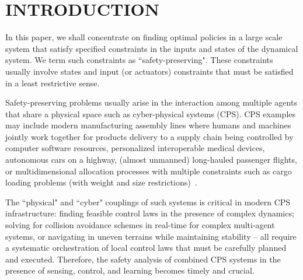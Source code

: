 
\section{INTRODUCTION}

In this paper, we shall concentrate on finding optimal policies in a large scale system that satisfy specified constraints in the inputs and states of the dynamical system. We term such constraints as ``safety-preserving". These constraints usually involve states and input (or actuators) constraints that must be satisfied in a least restrictive sense.  

Safety-preserving problems usually arise in the interaction among multiple agents that share a physical  space such as cyber-physical systems (CPS). CPS examples  may include modern manufacturing assembly lines where humans and machines jointly work together for   products delivery to a supply chain being controlled by computer software resources, personalized interoperable medical devices, autonomous cars on a highway, (almost unmanned) long-hauled passenger flights, or multidimensional allocation processes with multiple constraints such as cargo loading problems (with weight and size restrictions)~\cite[Ch. II]{AppliedDPBellman}.

The ``physical" and ``cyber" couplings of such systems is critical in modern CPS infrastructure: finding feasible control laws  in the presence of complex dynamics; solving for collision avoidance schemes in real-time  for complex multi-agent systems, or navigating in uneven terrains while maintaining stability -- all require a systematic orchestration of local control laws that must be carefully planned and executed. Therefore,  the safety analysis of combined CPS systems in the presence of sensing, control, and learning becomes timely and crucial. 


